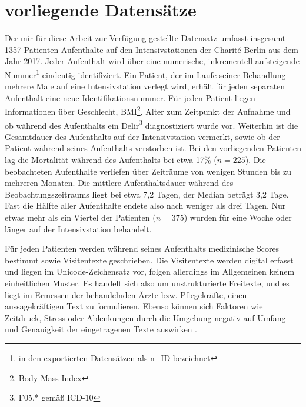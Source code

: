 \section{vorliegende Datensätze} \label{section:vorliegende_daten}
Der mir für diese Arbeit zur Verfügung gestellte Datensatz umfasst insgesamt 1357 Patienten-Aufenthalte auf den Intensivstationen der Charité Berlin aus dem Jahr 2017. Jeder Aufenthalt wird über eine numerische, inkrementell aufsteigende Nummer\footnote{in den exportierten Datensätzen als n\_ID bezeichnet} eindeutig identifiziert. Ein Patient, der im Laufe seiner Behandlung mehrere Male auf eine Intensivstation verlegt wird, erhält für jeden separaten Aufenthalt eine neue Identifikationsnummer. Für jeden Patient liegen Informationen über Geschlecht, BMI\footnote{Body-Mass-Index}, Alter zum Zeitpunkt der Aufnahme und ob während des Aufenthalts ein Delir\footnote{F05.* gemäß ICD-10} diagnostiziert wurde vor. Weiterhin ist die Gesamtdauer des Aufenthalts auf der Intensivstation vermerkt, sowie ob der Patient während seines Aufenthalts verstorben ist. Bei den vorliegenden Patienten lag die Mortalität während des Aufenthalts bei etwa 17\% ($n=225$). Die beobachteten Aufenthalte verliefen über Zeiträume von wenigen Stunden bis zu mehreren Monaten. Die mittlere Aufenthaltsdauer während des Beobachtungszeitraums liegt bei etwa 7,2 Tagen, der Median beträgt 3,2 Tage. Fast die Hälfte aller Aufenthalte endete also nach weniger als drei Tagen. Nur etwas mehr als ein Viertel der Patienten ($n=375$) wurden für eine Woche oder länger auf der Intensivstation behandelt.

Für jeden Patienten werden während seines Aufenthalts medizinische Scores  bestimmt sowie Visitentexte geschrieben. Die Visitentexte werden digital erfasst und liegen im Unicode-Zeichensatz vor, folgen allerdings im Allgemeinen keinem einheitlichen Muster. Es handelt sich also um unstrukturierte Freitexte, und es liegt im Ermessen der behandelnden Ärzte bzw. Pflegekräfte, einen aussagekräftigen Text zu formulieren. Ebenso können sich Faktoren wie Zeitdruck, Stress oder Ablenkungen durch die Umgebung negativ auf Umfang und Genauigkeit der eingetragenen Texte auswirken \citep{marxIntensivmedizin2015c}.

